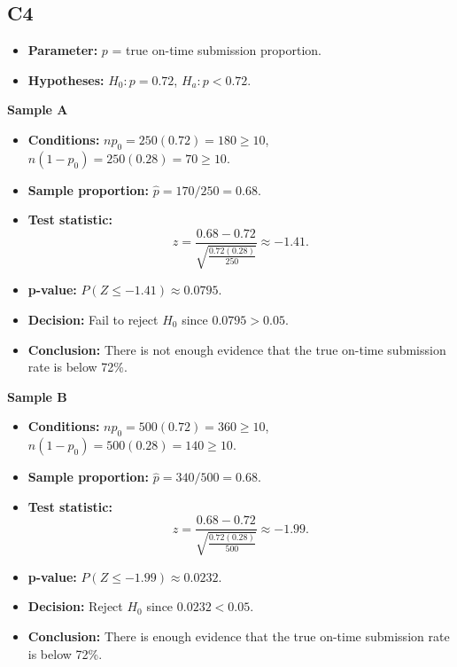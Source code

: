 \subsection*{C4}
\begin{itemize}
	\item \textbf{Parameter:} \(p\) = true on-time submission proportion.
	\item \textbf{Hypotheses:} \(H_0\colon p=0.72\), \(H_a\colon p<0.72\).
\end{itemize}

\textbf{Sample A}

\begin{itemize}
	\item \textbf{Conditions:} \(np_0=250(0.72)=180\ge10\), \(n(1-p_0)=250(0.28)=70\ge10\).
	\item \textbf{Sample proportion:} \(\hat p=170/250=0.68\).
	\item \textbf{Test statistic:}
	\[
	z=\frac{0.68-0.72}{\sqrt{\frac{0.72(0.28)}{250}}}\approx -1.41.
	\]
	\item \textbf{p-value:} \(P(Z\le -1.41)\approx 0.0795\).
	\item \textbf{Decision:} Fail to reject \(H_0\) since \(0.0795>0.05\).
	\item \textbf{Conclusion:} There is not enough evidence that the true on-time submission rate is below 72\%.
\end{itemize}

\begin{center}
\end{center}


\textbf{Sample B}

\begin{itemize}
	\item \textbf{Conditions:} \(np_0=500(0.72)=360\ge10\), \(n(1-p_0)=500(0.28)=140\ge10\).
	\item \textbf{Sample proportion:} \(\hat p=340/500=0.68\).
	\item \textbf{Test statistic:}
	\[
	z=\frac{0.68-0.72}{\sqrt{\frac{0.72(0.28)}{500}}}\approx -1.99.
	\]
	\item \textbf{p-value:} \(P(Z\le -1.99)\approx 0.0232\).
	\item \textbf{Decision:} Reject \(H_0\) since \(0.0232<0.05\).
	\item \textbf{Conclusion:} There is enough evidence that the true on-time submission rate is below 72\%.
\end{itemize}

